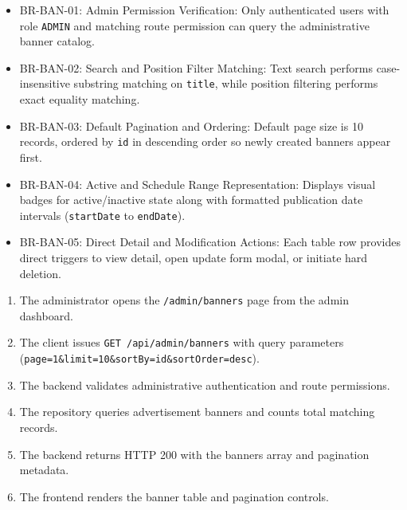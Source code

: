 \begin{itemize}[leftmargin=1.6em,topsep=3pt,itemsep=2pt,parsep=0pt,label=$\bullet$]\brrulelist
    \item BR-BAN-01: Admin Permission Verification: Only authenticated users with role \texttt{ADMIN} and matching route permission can query the administrative banner catalog.
    \item BR-BAN-02: Search and Position Filter Matching: Text search performs case-insensitive substring matching on \texttt{title}, while position filtering performs exact equality matching.
    \item BR-BAN-03: Default Pagination and Ordering: Default page size is 10 records, ordered by \texttt{id} in descending order so newly created banners appear first.
    \item BR-BAN-04: Active and Schedule Range Representation: Displays visual badges for active/inactive state along with formatted publication date intervals (\texttt{startDate} to \texttt{endDate}).
    \item BR-BAN-05: Direct Detail and Modification Actions: Each table row provides direct triggers to view detail, open update form modal, or initiate hard deletion.
\end{itemize}

\begin{enumerate}[leftmargin=1.6em,topsep=3pt,itemsep=2pt,parsep=0pt]
    \item The administrator opens the \texttt{/\allowbreak{}admin/\allowbreak{}banners} page from the admin dashboard.
    \item The client issues \texttt{GET /\allowbreak{}api/\allowbreak{}admin/\allowbreak{}banners} with query parameters (\texttt{page=\allowbreak{}1\&\allowbreak{}limit=\allowbreak{}10\&\allowbreak{}sortBy=\allowbreak{}id\&\allowbreak{}sortOrder=\allowbreak{}desc}).
    \item The backend validates administrative authentication and route permissions.
    \item The repository queries advertisement banners and counts total matching records.
    \item The backend returns HTTP 200 with the banners array and pagination metadata.
    \item The frontend renders the banner table and pagination controls.
\end{enumerate}

